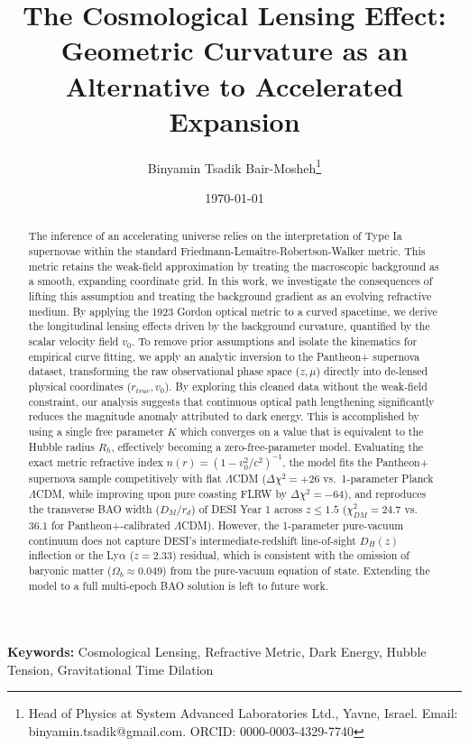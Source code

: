 \documentclass[11pt]{article}
\title{The Cosmological Lensing Effect:\\ Geometric Curvature as an Alternative to Accelerated Expansion}
\author{Binyamin Tsadik Bair-Mosheh\thanks{Head of Physics at System Advanced Laboratories Ltd., Yavne, Israel. Email: binyamin.tsadik@gmail.com. ORCID: 0000-0003-4329-7740 }}
\date{\today}
\begin{document}
\maketitle

\begin{abstract}
The inference of an accelerating universe relies on the interpretation of Type Ia supernovae within the standard Friedmann-Lema\^itre-Robertson-Walker metric. This metric retains the weak-field approximation by treating the macroscopic background as a smooth, expanding coordinate grid. In this work, we investigate the consequences of lifting this assumption and treating the background gradient as an evolving refractive medium. By applying the 1923 Gordon optical metric to a curved spacetime, we derive the longitudinal lensing effects driven by the background curvature, quantified by the scalar velocity field $v_0$. To remove prior assumptions and isolate the kinematics for empirical curve fitting, we apply an analytic inversion to the Pantheon+ supernova dataset, transforming the raw observational phase space ($z, \mu$) directly into de-lensed physical coordinates ($r_{true}, v_0$). By exploring this cleaned data without the weak-field constraint, our analysis suggests that continuous optical path lengthening significantly reduces the magnitude anomaly attributed to dark energy. This is accomplished by using a single free parameter $K$ which converges on a value that is equivalent to the Hubble radius $R_h$, effectively becoming a zero-free-parameter model. Evaluating the exact metric refractive index $n(r) = (1 - v_0^2/c^2)^{-1}$, the model fits the Pantheon+ supernova sample competitively with flat $\Lambda$CDM ($\Delta\chi^2 = +26$ vs.\ 1-parameter Planck $\Lambda$CDM, while improving upon pure coasting FLRW by $\Delta\chi^2 = -64$), and reproduces the transverse BAO width ($D_M/r_d$) of DESI Year 1 across $z \le 1.5$ ($\chi^2_{DM} = 24.7$ vs.\ $36.1$ for Pantheon+-calibrated $\Lambda$CDM). However, the 1-parameter pure-vacuum continuum does not capture DESI's intermediate-redshift line-of-sight $D_H(z)$ inflection or the Ly$\alpha$ ($z=2.33$) residual, which is consistent with the omission of baryonic matter ($\Omega_b \approx 0.049$) from the pure-vacuum equation of state. Extending the model to a full multi-epoch BAO solution is left to future work.
\end{abstract}

\vspace{0.5cm}
\noindent \textbf{Keywords:} Cosmological Lensing, Refractive Metric, Dark Energy, Hubble Tension, Gravitational Time Dilation
\end{document}
